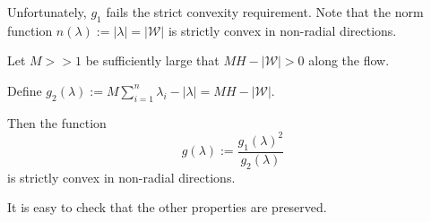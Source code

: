 \documentclass[12pt,ignorenonframes]{beamer}
\theoremstyle{plain}
\numberwithin{equation}{section}
\newtheorem{thm}{Theorem}[section]
\theoremstyle{remark}
\newcommand{\W}{\mathcal{W}}
\def\bann #1\eann {\begin{align*} #1\end{align*}}
\def\bi #1\ei {\begin{itemize} #1\end{itemize}}
\def\bf #1\ef {\begin{frame}<presentation> #1\end{frame}}
\begin{document}
\bf{Constructing $G$}
Unfortunately, $g_1$ fails the strict convexity requirement. 
\bi 
\item Note that the norm function $n(\lambda):=|\lambda|=|\W|$ is strictly convex in non-radial directions.
\item Let $M>>1$ be sufficiently large that $MH-|\W|>0$ along the flow.
\item Define $g_2(\lambda):=M\sum_{i=1}^n\lambda_i-|\lambda|=MH-|\W|$. 
\item Then the function
$$
g(\lambda):=\frac{g_1(\lambda)^2}{g_2(\lambda)}
$$
is strictly convex in non-radial directions.
\item It is easy to check that the other properties are preserved.
\ei
\ef


\end{document}
